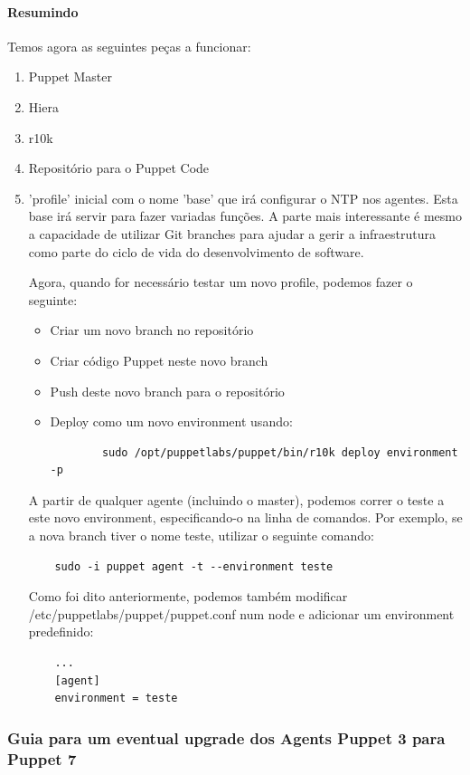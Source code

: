 \documentclass{article}
\begin{document}
\paragraph{Resumindo}
Temos agora as seguintes peças a funcionar:
\begin{enumerate}
    \item Puppet Master
    \item Hiera
    \item r10k
    \item Repositório para o Puppet Code
    \item 'profile' inicial com o nome 'base' que irá configurar o NTP nos agentes. Esta base irá servir para fazer variadas funções. A parte mais interessante é mesmo a capacidade de utilizar Git branches para ajudar a gerir a infraestrutura como parte do ciclo de vida do desenvolvimento de software.
    
    Agora, quando for necessário testar um novo profile, podemos fazer o seguinte:
    \begin{itemize}
        \item Criar um novo branch no repositório
        \item Criar código Puppet neste novo branch
        \item Push deste novo branch para o repositório
        \item Deploy como um novo environment usando: 
        \begin{lstlisting}
        sudo /opt/puppetlabs/puppet/bin/r10k deploy environment -p
        \end{lstlisting}
    \end{itemize}
    A partir de qualquer agente (incluindo o master), podemos correr o teste a este novo environment, especificando-o na linha de comandos. Por exemplo, se a nova branch tiver o nome teste, utilizar o seguinte comando:
    \begin{lstlisting}
    sudo -i puppet agent -t --environment teste
    \end{lstlisting}
    Como foi dito anteriormente, podemos também modificar /etc/puppetlabs/puppet/puppet.conf num node e adicionar um environment predefinido:
    \begin{lstlisting}
    ...
    [agent]
    environment = teste
    \end{lstlisting}
\end{enumerate}

\subsubsection{Guia para um eventual upgrade dos Agents Puppet 3 para Puppet 7}
\end{document}
